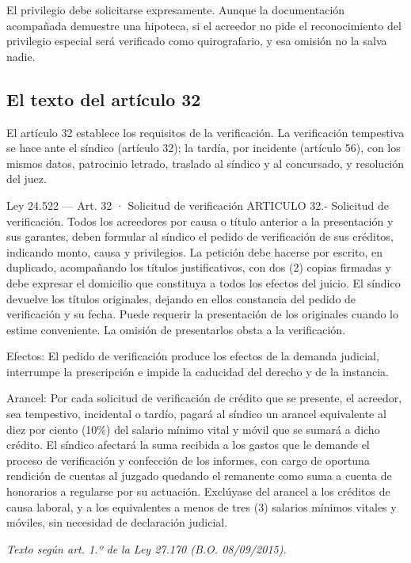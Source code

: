 \documentclass[12pt,oneside]{book}
\begin{document}
\begin{important}
El privilegio debe solicitarse expresamente. Aunque la documentación acompañada demuestre una hipoteca, si el acreedor no pide el reconocimiento del privilegio especial será verificado como quirografario, y esa omisión no la salva nadie.
\end{important}

\subsection{El texto del artículo 32}

El artículo 32 establece los requisitos de la verificación. La verificación tempestiva se hace ante el síndico (artículo 32); la tardía, por incidente (artículo 56), con los mismos datos, patrocinio letrado, traslado al síndico y al concursado, y resolución del juez.

\begin{legal}{Ley 24.522 — Art. 32 · Solicitud de verificación}
ARTICULO 32.- Solicitud de verificación. Todos los acreedores por causa o título anterior a la presentación y sus garantes, deben formular al síndico el pedido de verificación de sus créditos, indicando monto, causa y privilegios. La petición debe hacerse por escrito, en duplicado, acompañando los títulos justificativos, con dos (2) copias firmadas y debe expresar el domicilio que constituya a todos los efectos del juicio. El síndico devuelve los títulos originales, dejando en ellos constancia del pedido de verificación y su fecha. Puede requerir la presentación de los originales cuando lo estime conveniente. La omisión de presentarlos obsta a la verificación.

Efectos: El pedido de verificación produce los efectos de la demanda judicial, interrumpe la prescripción e impide la caducidad del derecho y de la instancia.

Arancel: Por cada solicitud de verificación de crédito que se presente, el acreedor, sea tempestivo, incidental o tardío, pagará al síndico un arancel equivalente al diez por ciento (10\%) del salario mínimo vital y móvil que se sumará a dicho crédito. El síndico afectará la suma recibida a los gastos que le demande el proceso de verificación y confección de los informes, con cargo de oportuna rendición de cuentas al juzgado quedando el remanente como suma a cuenta de honorarios a regularse por su actuación. Exclúyase del arancel a los créditos de causa laboral, y a los equivalentes a menos de tres (3) salarios mínimos vitales y móviles, sin necesidad de declaración judicial.

{\footnotesize\itshape Texto según art. 1.º de la Ley 27.170 (B.O. 08/09/2015).}
\end{legal}
\end{document}
